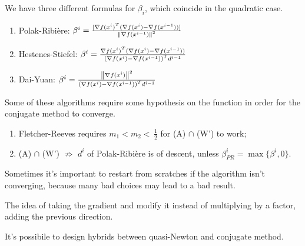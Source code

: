 \documentclass[computational_mathematics.tex]{subfiles}
\begin{document}

We have three different formulas for $\beta_i$, which coincide in the quadratic case.

\begin{enumerate}
  \item Polak-Ribi\`ere: $\beta^i = \frac{[\nabla {f(x^i)}^{T} (\nabla f(x^i) - \nabla f(x^{i-1}))]}{{\left\lVert\nabla f(x^{i-1})\right\rVert}^2}$  
  \item Hestenes-Stiefel: $\beta^i = \frac{{\nabla f(x^i)}^{T}(\nabla f(x^i) - \nabla f(x^{i-1}))}{{(\nabla f(x^i) - \nabla f(x^{i-1}))}^{T}d^{i-1}}$
    
  \item Dai-Yuan: $\beta^i = \frac{{\left\lVert\nabla f(x^i)\right\rVert}^2}{{(\nabla f(x^i) - \nabla f(x^{i-1}))}^{T} d^{i-1}}$
\end{enumerate}

Some of these algorithms require some hypothesis on the function in order for the conjugate method to converge.

\begin{enumerate}
  \item Fletcher-Reeves requires $m_1 < m_2 < \, \frac{1}{2}$ for (A) $\cap$ (W') to work;
  \item (A) $\cap$ (W') $\not\Longrightarrow$ $d^i$ of Polak-Ribière is of descent, unless $\beta^i_{PR} = \max \{\beta^i, 0\}$.
\end{enumerate}

Sometimes it's important to restart from scratches if the algorithm isn't converging, because many bad choices may lead to a bad result.

The idea of taking the gradient and modify it instead of multiplying by a factor, adding the previous direction.

It's possibile to design hybrids between quasi-Newton and conjugate method.
\end{document}

